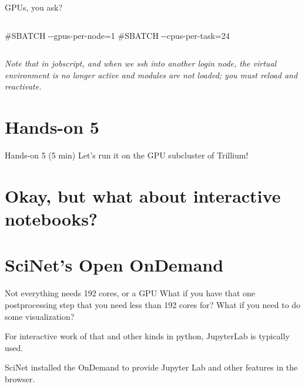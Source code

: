 \documentclass[
  10pt,
  ignorenonframetext,
  aspectratio=169]{beamer}
\newenvironment{Shaded}{\begin{snugshade}}{\end{snugshade}}
\newcommand{\CommentTok}[1]{\textcolor[rgb]{0.50,0.62,0.50}{#1}}
\begin{document}
\begin{frame}[fragile]{GPUs, you ask?}
\begin{columns}[T]
\begin{column}{0.47\linewidth}
\begin{Shaded}
\begin{Highlighting}[]
\CommentTok{\#SBATCH {-}{-}gpus{-}per{-}node=1}
\CommentTok{\#SBATCH {-}{-}cpus{-}per{-}task=24}
\end{Highlighting}
\end{Shaded}
\end{column}
\end{columns}

\pause

\emph{Note that in jobscript, and when we ssh into another login node, the virtual environment is no longer active and modules are not loaded; you must reload and reactivate.}
\end{frame}

\section{Hands-on 5}\label{hands-on-5}

\begin{frame}{Hands-on 5 (5 min)}
\label{hands-on-5-5-min}
Let's run it on the GPU subcluster of Trillium!
\end{frame}

\section{Okay, but what about interactive notebooks?}\label{okay-but-what-about-interactive-notebooks}

\section{SciNet's Open OnDemand}\label{scinets-open-ondemand}

\begin{frame}{Not everything needs 192 cores, or a GPU}
\label{not-everything-needs-192-cores-or-a-gpu}
What if you have that one postprocessing step that you need less than 192 cores for? \vspace{\baselineskip} What if you need to do some visualization? \vspace{\baselineskip}

\pause

For interactive work of that and other kinds in python, JupyterLab is typically used.

\pause

SciNet installed the OnDemand to provide Jupyter Lab and other features in the browser.
\end{frame}
\end{document}
